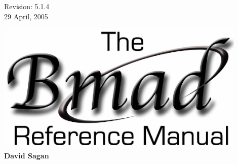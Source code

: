 \thispagestyle{empty}

\begin{flushright}
\large
  Revision: 5.1.4 \\
  29 April, 2005 \\
\end{flushright}

\vfill

{
\begin{center}
\includegraphics[width=12cm]{bmad_ref_manual.eps} \\
\vskip 0.3in
\huge\bf David Sagan
\end{center}
}

\vfill
\break